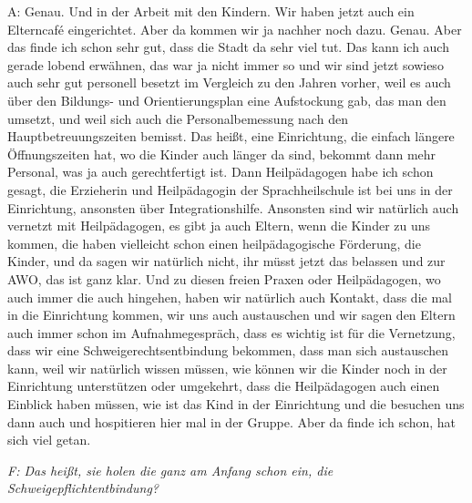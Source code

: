 A: Genau. Und in der Arbeit mit den Kindern. Wir haben jetzt auch ein Elterncafé eingerichtet. Aber da kommen wir ja nachher noch dazu. Genau. Aber das finde ich schon sehr gut, dass die Stadt da sehr viel tut. Das kann ich auch gerade lobend erwähnen, das war ja nicht immer so und wir sind jetzt sowieso auch sehr gut personell besetzt im Vergleich zu den Jahren vorher, weil es auch über den Bildungs- und Orientierungsplan eine Aufstockung gab, das man den umsetzt, und weil sich auch die Personalbemessung nach den Hauptbetreuungszeiten bemisst. Das heißt, eine Einrichtung, die einfach längere Öffnungszeiten hat, wo die Kinder auch länger da sind, bekommt dann mehr Personal, was ja auch gerechtfertigt ist. Dann Heilpädagogen habe ich schon gesagt, die Erzieherin und Heilpädagogin der Sprachheilschule ist bei uns in der Einrichtung, ansonsten über Integrationshilfe. Ansonsten sind wir natürlich auch vernetzt mit Heilpädagogen, es gibt ja auch Eltern, wenn die Kinder zu uns kommen, die haben vielleicht schon einen heilpädagogische Förderung, die Kinder, und da sagen wir natürlich nicht, ihr müsst jetzt das belassen und zur AWO, das ist ganz klar. Und zu diesen freien Praxen oder Heilpädagogen, wo auch immer die auch hingehen, haben wir natürlich auch Kontakt, dass die mal in die Einrichtung kommen, wir uns auch austauschen und wir sagen den Eltern auch immer schon im Aufnahmegespräch, dass es wichtig ist für die Vernetzung, dass wir eine Schweigerechtsentbindung bekommen, dass man sich austauschen kann, weil wir natürlich wissen müssen, wie können wir die Kinder noch in der Einrichtung unterstützen oder umgekehrt, dass die Heilpädagogen auch einen Einblick haben müssen, wie ist das Kind in der Einrichtung und die besuchen uns dann auch und hospitieren hier mal in der Gruppe. Aber da finde ich schon, hat sich viel getan.

\emph{F: Das heißt, sie holen die ganz am Anfang schon ein, die Schweigepflichtentbindung?}

